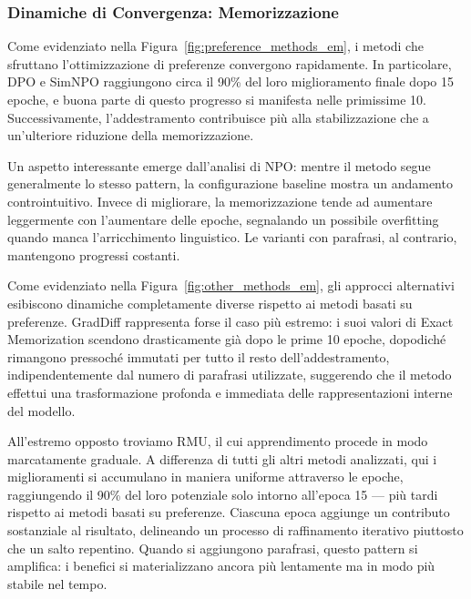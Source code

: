 \subsubsection{Dinamiche di Convergenza: Memorizzazione}

Come evidenziato nella Figura~\ref{fig:preference_methods_em}, i metodi che sfruttano l'ottimizzazione di preferenze convergono rapidamente. In particolare, DPO e SimNPO raggiungono circa il 90\% del loro miglioramento finale dopo 15 epoche, e buona parte di questo progresso si manifesta nelle primissime 10. Successivamente, l'addestramento contribuisce più alla stabilizzazione che a un'ulteriore riduzione della memorizzazione. 

Un aspetto interessante emerge dall'analisi di NPO: mentre il metodo segue generalmente lo stesso pattern, la configurazione baseline mostra un andamento controintuitivo. Invece di migliorare, la memorizzazione tende ad aumentare leggermente con l'aumentare delle epoche, segnalando un possibile overfitting quando manca l'arricchimento linguistico. Le varianti con parafrasi, al contrario, mantengono progressi costanti.

Come evidenziato nella Figura~\ref{fig:other_methods_em}, gli approcci alternativi esibiscono dinamiche completamente diverse rispetto ai metodi basati su preferenze. GradDiff rappresenta forse il caso più estremo: i suoi valori di Exact Memorization scendono drasticamente già dopo le prime 10 epoche, dopodiché rimangono pressoché immutati per tutto il resto dell'addestramento, indipendentemente dal numero di parafrasi utilizzate, suggerendo che il metodo effettui una trasformazione profonda e immediata delle rappresentazioni interne del modello.

All'estremo opposto troviamo RMU, il cui apprendimento procede in modo marcatamente graduale. A differenza di tutti gli altri metodi analizzati, qui i miglioramenti si accumulano in maniera uniforme attraverso le epoche, raggiungendo il 90\% del loro potenziale solo intorno all'epoca 15 — più tardi rispetto ai metodi basati su preferenze. Ciascuna epoca aggiunge un contributo sostanziale al risultato, delineando un processo di raffinamento iterativo piuttosto che un salto repentino. Quando si aggiungono parafrasi, questo pattern si amplifica: i benefici si materializzano ancora più lentamente ma in modo più stabile nel tempo.

